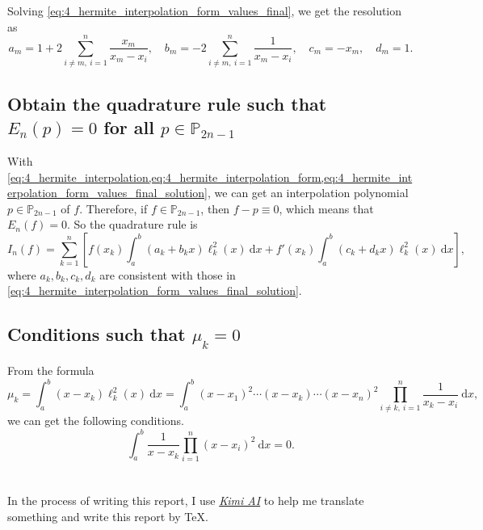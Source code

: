 \documentclass[a4paper]{article}
\begin{document}
Solving \cref{eq:4_hermite_interpolation_form_values_final}, we get the resolution as 
\begin{equation}
    a_m = 1 + 2\sum_{i \ne m,\ i = 1}^n \frac{x_m}{x_m - x_i},\quad b_m = -2\sum_{i \ne m,\ i = 1}^n \frac{1}{x_m - x_i},\quad c_m = -x_m,\quad d_m = 1.
    \label{eq:4_hermite_interpolation_form_values_final_solution}
\end{equation}

\subsection{Obtain the quadrature rule such that $E_n(p) = 0$ for all $p \in \mathbb{P}_{2n - 1}$}

With \cref{eq:4_hermite_interpolation,eq:4_hermite_interpolation_form,eq:4_hermite_interpolation_form_values_final_solution}, we can get an interpolation polynomial $p \in \mathbb{P}_{2n - 1}$ of $f$.
Therefore, if $f \in \mathbb{P}_{2n - 1}$, then $f - p \equiv 0$, which means that $E_n(f) = 0$. So the quadrature rule is 
\begin{equation}
    I_n(f) = \sum_{k = 1}^n \left[f(x_k) \int_a^b (a_k + b_kx)\ell^2_k(x)\ \mathrm{d}x + f'(x_k) \int_a^b (c_k + d_kx)\ell^2_k(x)\ \mathrm{d}x \right],
    \label{eq:4_hermite_quadrature_rule}
\end{equation}
where $a_k, b_k, c_k, d_k$ are consistent with those in \cref{eq:4_hermite_interpolation_form_values_final_solution}.

\subsection{Conditions such that $\mu_k = 0$}

From the formula
\begin{equation}
    \mu_k = \int_a^b (x - x_k) \ell^2_k(x)\ \mathrm{d}x = \int_a^b (x - x_1)^2 \cdots (x - x_k) \cdots (x - x_n)^2 \prod_{i \ne k,\ i = 1}^n \frac{1}{x_k - x_i}\ \mathrm{d}x,
    \label{eq:4_hermite_quadrature_rule_mu}
\end{equation}
we can get the following conditions.
\begin{equation}
    \int_a^b \frac{1}{x - x_k} \prod_{i = 1}^n (x - x_i)^2\ \mathrm{d}x = 0.
    \label{eq:4_hermite_quadrature_rule_mu_condition}
\end{equation}

\section*{  }

In the process of writing this report, I use \href{https://kimi.moonshot.cn/}{\textit{Kimi AI}} to help me translate something and write this report by \TeX.
\end{document}
